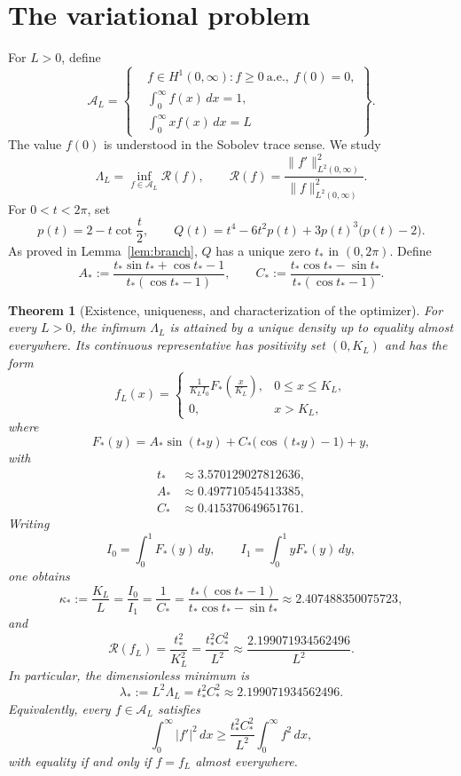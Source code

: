 \documentclass[11pt]{amsart}
\newtheorem{theorem}{Theorem}[section]
\theoremstyle{definition}
\theoremstyle{remark}
\newcommand{\A}{\mathcal A}
\newcommand{\Rcal}{\mathcal R}
\begin{document}
\section{The variational problem}
For $L>0$, define
\[
 \A_L=\left\{\begin{aligned}
 &f\in H^1(0,\infty):
 f\geq0\ \text{a.e.},\ f(0)=0,\\
 &\int_0^\infty f(x)\,dx=1,\\
 &\int_0^\infty xf(x)\,dx=L
 \end{aligned}\right\}.
\]
The value $f(0)$ is understood in the Sobolev trace sense. We study
\[
 \Lambda_L=\inf_{f\in\A_L}\Rcal(f),\qquad
 \Rcal(f)=\frac{\|f'\|_{L^2(0,\infty)}^2}{\|f\|_{L^2(0,\infty)}^2}.
\]
For $0<t<2\pi$, set
\[
 p(t)=2-t\cot\frac t2,
 \qquad
 Q(t)=t^4-6t^2p(t)+3p(t)^3\bigl(p(t)-2\bigr).
\]
As proved in Lemma~\ref{lem:branch}, $Q$ has a unique zero $t_*$ in
$(0,2\pi)$. Define
\[
 A_*:=\frac{t_*\sin t_*+\cos t_*-1}{t_*(\cos t_*-1)},
 \qquad
 C_*:=\frac{t_*\cos t_*-\sin t_*}{t_*(\cos t_*-1)}.
\]

\begin{theorem}[Existence, uniqueness, and characterization of the optimizer]\label{thm:main}
For every $L>0$, the infimum $\Lambda_L$ is attained by a unique density up
to equality almost everywhere. Its continuous representative has positivity
set $(0,K_L)$ and has the form
\[
 f_L(x)=
 \begin{cases}
 \displaystyle\frac{1}{K_L I_0}F_*\!\left(\frac{x}{K_L}\right),&0\leq x\leq K_L,\\[7pt]
 0,&x>K_L,
 \end{cases}
\]
where
\[
 F_*(y)=A_*\sin(t_*y)+C_*\bigl(\cos(t_*y)-1\bigr)+y,
\]
with
\[
 \begin{aligned}
 t_*&\approx3.570129027812636,\\
 A_*&\approx0.497710545413385,\\
 C_*&\approx0.415370649651761.
 \end{aligned}
\]
Writing
\[
 I_0=\int_0^1F_*(y)\,dy,
\qquad I_1=\int_0^1yF_*(y)\,dy,
\]
one obtains
\[
 \kappa_*:=\frac{K_L}{L}=\frac{I_0}{I_1}=\frac{1}{C_*}
 =\frac{t_*(\cos t_*-1)}{t_*\cos t_*-\sin t_*}
 \approx2.407488350075723,
\]
and
\[
 \Rcal(f_L)=\frac{t_*^2}{K_L^2}
 =\frac{t_*^2 C_*^2}{L^2}
 \approx\frac{2.199071934562496}{L^2}.
\]
In particular, the dimensionless minimum is
\[
 \lambda_*:=L^2\Lambda_L=t_*^2C_*^2
 \approx2.199071934562496.
\]
Equivalently, every $f\in\A_L$ satisfies
\[
 \int_0^\infty |f'|^2\,dx
 \geq \frac{t_*^2C_*^2}{L^2}\int_0^\infty f^2\,dx,
\]
with equality if and only if $f=f_L$ almost everywhere.
\end{theorem}
\end{document}
